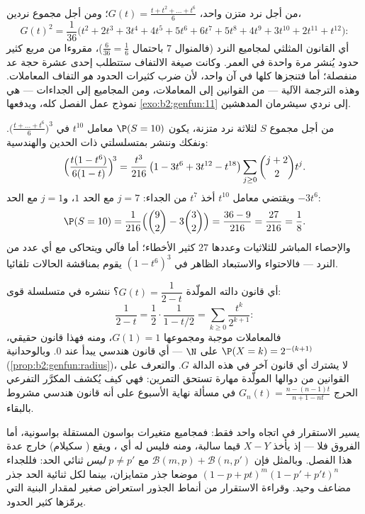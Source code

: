 \begin{example}\label{ex:b2:genfun:twodice}
من أجل نرد متزن واحد، $G(t) = \frac{t + t^2 + \dots + t^6}{6}$؛ ومن أجل مجموع نردين،
\[
G(t)^2 = \frac{1}{36}\bigl(t^2 + 2t^3 + 3t^4 + 4t^5 + 5t^6 +
6t^7 + 5t^8 + 4t^9 + 3t^{10} + 2t^{11} + t^{12}\bigr) :
\]
أي القانون المثلثي لمجاميع النرد (فالمنوال $7$ باحتمال $\frac6{36} = \frac16$)،
مقروءا من مربع كثير حدود يُنشر مرة واحدة في العمر. وكانت صيغة
الالتفاف ستتطلب إحدى عشرة حجة عد منفصلة؛ أما  فتنجزها
كلها في آن واحد، لأن ضرب كثيرات الحدود \emph{هو} التفاف المعاملات.
وهذه الترجمة الآلية --- من القوانين إلى المعاملات، ومن المجاميع إلى
الجداءات --- هي نموذج عمل الفصل كله، ويدفعها \cref{exo:b2:genfun:11} إلى نردي سيشرمان
المدهشين.
\end{example}

\begin{example}\label{ex:b2:genfun:threedice}
من أجل مجموع $S$ لثلاثة نرد متزنة، يكون $\P(S = 10)$ معامل $t^{10}$ في
$\bigl(\frac{t + \dots +
t^6}6\bigr)^3$. ونفكك وننشر بمتسلسلتي ذات الحدين والهندسية:
\[
\Bigl(\frac{t(1 - t^6)}{6(1 - t)}\Bigr)^{\!3}
= \frac{t^3}{216}\,\bigl(1 - 3t^6 + 3t^{12} -
t^{18}\bigr)\sum_{j\geq0}\binom{j+2}2t^j .
\]
ويقتضي معامل $t^{10}$ أخذ $t^7$ من الجداء: $j = 7$ مع الحد $1$،
و$j = 1$ مع الحد $-3t^6$:
\[
\P(S = 10) = \frac{1}{216}\Bigl(\binom92 -
3\binom32\Bigr) = \frac{36 - 9}{216} = \frac{27}{216} =
\frac18 .
\]
والإحصاء المباشر للثلاثيات وعددها $27$ كثير الأخطاء؛ أما 
فآلي ويتحاكى مع أي عدد من النرد --- فالاحتواء والاستبعاد الظاهر في
$(1 - t^6)^3$ يقوم بمناقشة الحالات تلقائيا.
\end{example}

\begin{example}\label{ex:b2:genfun:identify}
أي قانون دالته المولّدة $G(t) = \dfrac1{2 - t}$؟ ننشره في متسلسلة قوى:
\[
\frac{1}{2 - t} = \frac12\cdot\frac1{1 - t/2}
= \sum_{k\geq0}\frac{t^k}{2^{k+1}} :
\]
فالمعاملات موجبة ومجموعها $G(1) = 1$، ومنه فهذا قانون حقيقي، $\P(X = k) = 2^{-(k+1)}$ على
$\N$ --- أي قانون هندسي يبدأ عند $0$. وبالوحدانية (\cref{prop:b2:genfun:radius})،
لا يشترك أي قانون آخر في هذه الدالة $G$. والتعرف على القوانين من
دوالها المولّدة مهارة تستحق التمرين: فهي كيف يُكشف المكرَّر التفرعي
الحرج $G_n(t) = \frac{n - (n-1)t}{n+1 - nt}$ في مسألة نهاية الأسبوع على أنه قانون هندسي مشروط
بالبقاء.
\end{example}

\begin{remark}
يسير الاستقرار في اتجاه واحد فقط: فمجاميع متغيرات بواسون المستقلة
بواسونية، أما الفروق فلا --- إذ يأخذ $X - Y$ قيما سالبة، ومنه فليس
له أي ، ويقع  ( سكيلام) خارج عدة هذا الفصل.
وبالمثل فإن $\mathcal B(m, p) + \mathcal B(n, p')$ مع $p \neq p'$ \emph{ليس} ثنائي الحد: فللجداء $(1 - p +
pt)^m(1 - p' + p't)^n$
موضعا جذر متمايزان، بينما لكل  ثنائية الحد جذر مضاعف
وحيد. وقراءة الاستقرار من أنماط الجذور استعراض صغير لمقدار البنية
التي يرمّزها كثير الحدود.
\end{remark}

